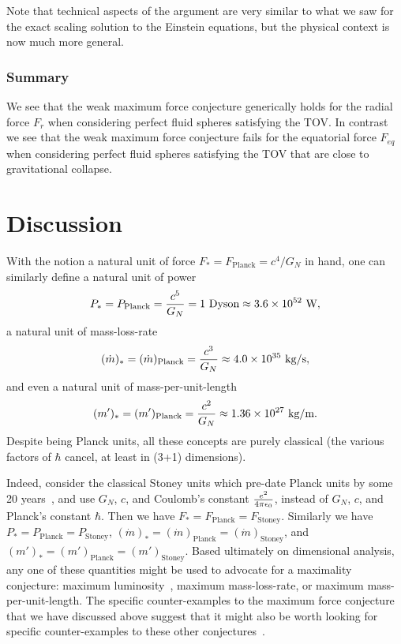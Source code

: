 \documentclass[12pt]{article}
\begin{document}
Note that technical aspects of the argument are very similar to what we saw for the exact scaling solution to the Einstein equations, but the physical context is now much more general. 

\subsubsection{Summary}

We see that the weak maximum force conjecture generically holds for the radial force $F_r$ when considering perfect fluid spheres satisfying the TOV. In contrast we see that the weak maximum force conjecture fails for the equatorial force $F_{eq}$ when considering perfect fluid spheres satisfying the TOV that are close to gravitational collapse. 

\section{Discussion}
With the notion a natural unit of force $F_* = F_\mathrm{Planck} = c^4/G_N$ in hand, one can similarly define a natural unit of power~\cite{Dyson, Barrow:2017, footnote5, Cardoso:2018, Bruneton:2013}
\begin{equation}
P_*= P_\mathrm{Planck} = {c^5\over G_N} = 1 \hbox{ Dyson} \approx 3.6\times 10^{52} \hbox{ W},
\end{equation}
a natural unit of mass-loss-rate
\begin{equation}
 (\dot m)_* = (\dot m) _\mathrm{Planck}= {c^3\over G_N} \approx 4.0\times 10^{35} \hbox{ kg/s},
\end{equation}
and even a natural unit of mass-per-unit-length
\begin{equation}
 (m')_* = (m') _\mathrm{Planck}= {c^2\over G_N} \approx 1.36\times 10^{27} \hbox{ kg/m}. 
\end{equation}
Despite being Planck units, all these concepts are purely classical (the various factors of $\hbar$ cancel, at least in (3+1) dimensions). 

Indeed, consider the classical Stoney units which pre-date Planck units by some 20 years~\cite{Stoney1, Stoney2, Stoney3}, and use $G_N$, $c$,
and Coulomb's constant $e^2\over4\pi\epsilon_0$, instead of $G_N$, $c$, and Planck's constant $\hbar$. 
Then we have $F_* = F_\mathrm{Planck} =F_\mathrm{Stoney}$. Similarly  we have $P_*= P_\mathrm{Planck}= P_\mathrm{Stoney}$,  $(\dot m)_* = (\dot m)_\mathrm{Planck}= (\dot m)_\mathrm{Stoney}$, 
and $(m')_* = (m') _\mathrm{Planck} = (m')_\mathrm{Stoney}$. 
Based ultimately on dimensional analysis, any one of these quantities might be used to advocate for a maximality conjecture: maximum luminosity~\cite{Dyson,  Barrow:2017, footnote5, Cardoso:2018, Bruneton:2013}, maximum mass-loss-rate, or maximum mass-per-unit-length. 
The specific counter-examples to the maximum force conjecture that we have discussed above suggest that it might also be worth looking for specific counter-examples to these other conjectures~\cite{Cardoso:2018}. 
\end{document}

